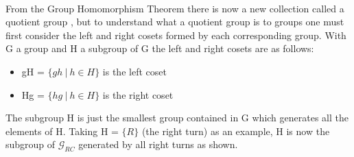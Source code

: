 \documentclass{article}
\begin{document}
\paragraph{} From the Group Homomorphism Theorem there is now a new collection called a quotient group , but to understand what a quotient group is to groups one must first consider the left and right cosets formed by each corresponding group.	
With G a group and H a subgroup of G the left and right cosets are as follows:
\begin{itemize}
\item gH = $\{gh\ |\ h \in H\}$ is the left coset 
\item Hg = $\{hg\ |\ h \in H\}$ is the right coset 
\end{itemize}
The subgroup H is just the smallest group contained in G which generates all the elements of H. Taking H = $\{R\}$ (the right turn) as an example, H is now the subgroup of $\mathcal{G}_{RC}$ generated by all right turns as shown. 
\end{document}
